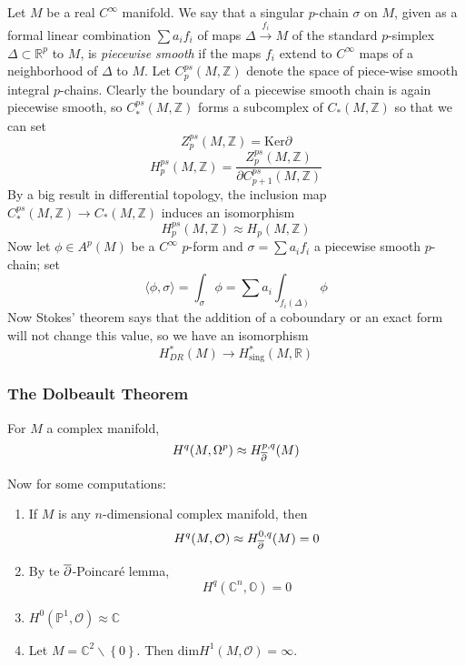 \indent Let $M$ be a real $ C^{\infty}$ manifold. We say that a singular $p$-chain $\sigma$ on $M$, given as a formal linear combination $\sum a_i f_i$ of maps $\Delta \xrightarrow{f_i} M$ of the standard $p$-simplex $\Delta \subset \mathbb{R}^p$ to $M$, is \textit{piecewise smooth} if the maps $f_i$ extend to $ C^{\infty}$ maps of a neighborhood of $\Delta$ to $M$. Let $C^{ps}_p \left( M, \mathbb{Z} \right) $ denote the space of piece-wise smooth integral $p$-chains. Clearly the boundary of a piecewise smooth chain is again piecewise smooth, so $C^{ps}_* \left( M, \mathbb{Z} \right) $ forms a subcomplex of $C_* \left( M, \mathbb{Z} \right) $ so that we can set
\[
	Z^{ps}_p \left( M, \mathbb{Z} \right) = \mathrm{Ker}\partial
\]
\[
	H^{ps}_p \left( M, \mathbb{Z} \right) = \frac{Z^{ps}_p \left( M, \mathbb{Z} \right) }{\partial C^{ps}_{p+1} \left( M, \mathbb{Z} \right) }
\]
By a big result in differential topology, the inclusion map $ C^{ps}_* \left( M, \mathbb{Z} \right) \to C_* \left( M, \mathbb{Z} \right) $ induces an isomorphism
\[
	H^{ps}_p \left( M, \mathbb{Z} \right) \approx H_p \left( M, \mathbb{Z} \right) 
\]
\indent Now let $ \phi \in A^p (M)$ be a $ C^{\infty} $ $p$-form and $\sigma = \sum a_i f_i$ a piecewise smooth $p$-chain; set
\[
	\langle \phi, \sigma \rangle = \int_{\sigma} \phi = \sum a_i \int_{f_i (\Delta)} \phi
\]
Now Stokes' theorem says that the addition of a coboundary or an exact form will not change this value, so we have an isomorphism
\[
	H^*_{DR} (M) \to H^*_{ \mathrm{sing} } (M, \mathbb{R})
\]

\subsubsection{The Dolbeault Theorem}


\begin{thm}

For $M$ a complex manifold,
\[
	H^q (M, \Omega^p) \approx H^{p,q}_{ \overline{\partial} } (M)
\]


\end{thm}
Now for some computations:

\begin{enumerate}
\item If $M$ is any $n$-dimensional complex manifold, then
	\[
		H^q (M, \mathcal{O}) \approx H^{0,q}_{ \overline{\partial} }(M) = 0
	\]
\item By te $ \overline{\partial}$-Poincar\'e lemma,
	\[
		H^q ( \mathbb{C}^n, \mathbb{O} ) = 0
	\]
\item $H^0 ( \mathbb{P}^1, \mathcal{O}) \approx \mathbb{C}$
\item Let $M = \mathbb{C}^2 \backslash \left\{ 0 \right\} $. Then $ \mathrm{dim}H^1 ( M, \mathcal{O}) = \infty$.
\end{enumerate}

